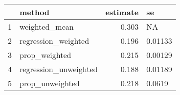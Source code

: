 \begin{table}[h]
\centering
\begin{tabular}{rlrl}
  \hline
 & method & estimate & se \\ 
  \hline
1 & weighted\_mean & 0.303 & NA \\ 
  2 & regression\_weighted & 0.196 & 0.01133 \\ 
  3 & prop\_weighted & 0.215 & 0.00129 \\ 
  4 & regression\_unweighted & 0.188 & 0.01189 \\ 
  5 & prop\_unweighted & 0.218 & 0.0619 \\ 
   \hline
\end{tabular}
\end{table}
